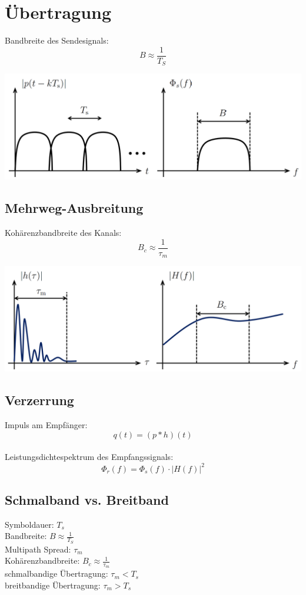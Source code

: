 \chapter{Übertragung}
Bandbreite des Sendesignals:
\[ B \approx \frac{1}{T_S} \]

\begin{center}
	\includegraphics[width=.9\textwidth]{../fig/eintrager.png}
\end{center}

\section{Mehrweg-Ausbreitung}
Kohärenzbandbreite des Kanals:
\[ B_c \approx \frac{1}{\tau_m} \]

\begin{center}
	\includegraphics[width=.9\textwidth]{../fig/mehrweg.png}
\end{center}

\section{Verzerrung}
Impuls am Empfänger:
\[ q(t) = (p * h)(t) \]
~\\
Leistungsdichtespektrum des Empfangssignals:
\[ \Phi_r(f) = \Phi_s(f) \cdot |H(f)|^2 \]

\section{Schmalband vs. Breitband}
Symboldauer: $T_s$\\
Bandbreite: $B \approx \frac{1}{T_S}$\\
Multipath Spread: $\tau_m$\\
Kohärenzbandbreite: $B_c \approx \frac{1}{\tau_m}$\\
schmalbandige Übertragung: $\tau_m < T_s$\\
breitbandige Übertragung: $\tau_m > T_s$

